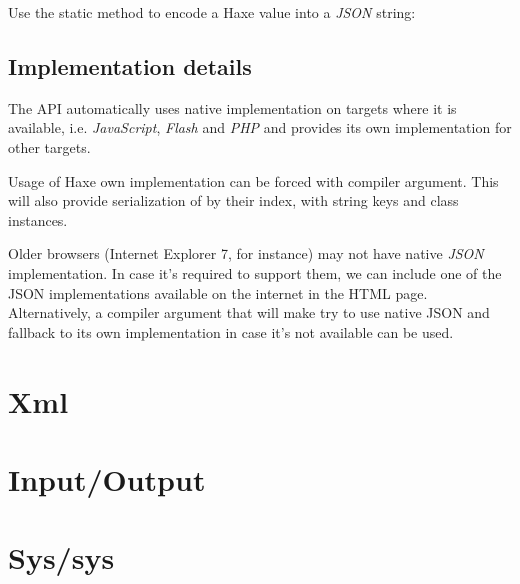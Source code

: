 Use the  static method to encode a Haxe value into a \emph{JSON} string:

\subsection{Implementation details}
\label{std-Json-implementation-details}

The  API automatically uses native implementation on targets where it is available, i.e. \emph{JavaScript}, \emph{Flash} and \emph{PHP} and provides its own implementation for other targets.

Usage of Haxe own implementation can be forced with  compiler argument. This will also provide serialization of  by their index,  with string keys and class instances.

Older browsers (Internet Explorer 7, for instance) may not have native \emph{JSON} implementation. In case it's required to support them, we can include one of the JSON implementations available on the internet in the HTML page. Alternatively, a  compiler argument that will make  try to use native JSON and fallback to its own implementation in case it's not available can be used.

\section{Xml}
\label{std-Xml}

\section{Input/Output}
\label{std-input-output}

\section{Sys/sys}
\label{std-sys}

